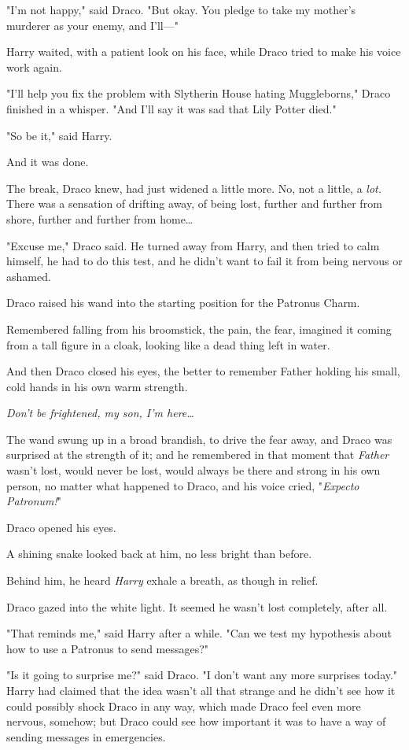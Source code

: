 "I’m not happy," said Draco. "But okay. You pledge to take my mother’s murderer
as your enemy, and I’ll—"

Harry waited, with a patient look on his face, while Draco tried to make his
voice work again.

"I’ll help you fix the problem with Slytherin House hating Muggleborns," Draco
finished in a whisper. "And I’ll say it was sad that Lily Potter died."

"So be it," said Harry.

And it was done.

The break, Draco knew, had just widened a little more. No, not a little, a
\emph{lot.} There was a sensation of drifting away, of being lost, further and
further from shore, further and further from home…

"Excuse me," Draco said. He turned away from Harry, and then tried to calm
himself, he had to do this test, and he didn’t want to fail it from being
nervous or ashamed.

Draco raised his wand into the starting position for the Patronus Charm.

Remembered falling from his broomstick, the pain, the fear, imagined it coming
from a tall figure in a cloak, looking like a dead thing left in water.

And then Draco closed his eyes, the better to remember Father holding his
small, cold hands in his own warm strength.

\emph{Don’t be frightened, my son, I’m here…}

The wand swung up in a broad brandish, to drive the fear away, and Draco was
surprised at the strength of it; and he remembered in that moment that
\emph{Father} wasn’t lost, would never be lost, would always be there and
strong in his own person, no matter what happened to Draco, and his voice
cried, "\emph{Expecto Patronum!}"

Draco opened his eyes.

A shining snake looked back at him, no less bright than before.

Behind him, he heard \emph{Harry} exhale a breath, as though in relief.

Draco gazed into the white light. It seemed he wasn’t lost completely, after
all.

"That reminds me," said Harry after a while. "Can we test my hypothesis about
how to use a Patronus to send messages?"

"Is it going to surprise me?" said Draco. "I don’t want any more surprises
today."
\later
Harry had claimed that the idea wasn’t all that strange and he didn’t see how
it could possibly shock Draco in any way, which made Draco feel even more
nervous, somehow; but Draco could see how important it was to have a way of
sending messages in emergencies.

